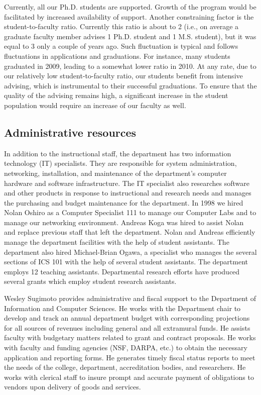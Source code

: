 \documentclass[12pt]{article}
\begin{document}
Currently, all our Ph.D. students are supported.  Growth of the program
would be facilitated by increased availability of support.  Another
constraining factor is the student-to-faculty ratio. Currently this ratio
is about to 2 (i.e., on average a graduate faculty member advises 1
Ph.D. student and 1 M.S.  student), but it was equal to 3 only a couple of
years ago. Such fluctuation is typical and follows fluctuations in
applications and graduations. For instance, many students graduated in
2009, leading to a somewhat lower ratio in 2010.  At any rate, due to our
relatively low student-to-faculty ratio, our students benefit from
intensive advising, which is instrumental to their successful graduations.
To ensure that the quality of the advising remains high, a significant
increase in the student population would require an increase of our faculty
as well.

\subsection{Administrative resources}

In addition to the instructional staff, the department has two information
technology (IT) specialists. They are responsible for system
administration, networking, installation, and maintenance of the
department’s computer hardware and software infrastructure. The IT
specialist also researches software and other products in response to
instructional and research needs and manages the purchasing and budget
maintenance for the department. In 1998 we hired Nolan Oshiro as a Computer
Specialist 111 to manage our Computer Labs and to manage our networking
environment. Andreas Koga was hired to assist Nolan and replace previous
staff that left the department. Nolan and Andreas efficiently manage the
department facilities with the help of student assistants. The department
also hired Michael-Brian Ogawa, a specialist who manages the several
sections of ICS 101 with the help of several student assistants. The
department employs 12 teaching assistants. Departmental research efforts
have produced several grants which employ student research assistants.

Wesley Sugimoto provides administrative and fiscal support to the
Department of Information and Computer Sciences. He works with the
Department chair to develop and track an annual department budget with
corresponding projections for all sources of revenues including general and
all extramural funds. He assists faculty with budgetary matters related to
grant and contract proposals. He works with faculty and funding agencies
(NSF, DARPA, etc.) to obtain the necessary application and reporting
forms. He generates timely fiscal status reports to meet the needs of the
college, department, accreditation bodies, and researchers. He works with
clerical staff to insure prompt and accurate payment of obligations to
vendors upon delivery of goods and services.
\end{document}
